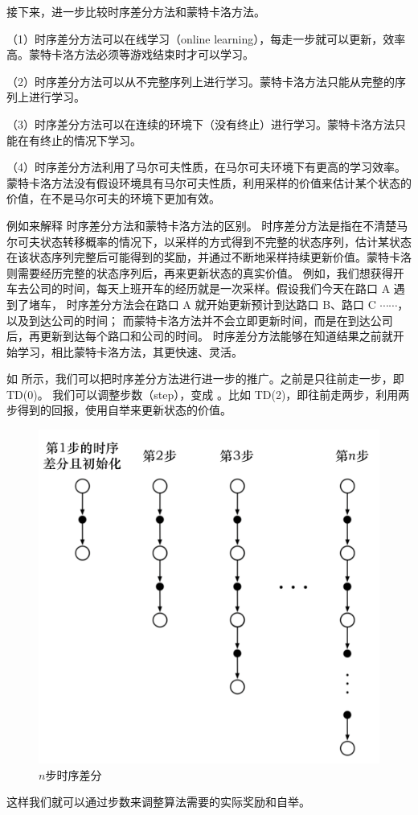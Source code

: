 接下来，进一步比较时序差分方法和蒙特卡洛方法。

（1）时序差分方法可以在线学习（online learning），每走一步就可以更新，效率高。蒙特卡洛方法必须等游戏结束时才可以学习。

（2）时序差分方法可以从不完整序列上进行学习。蒙特卡洛方法只能从完整的序列上进行学习。

（3）时序差分方法可以在连续的环境下（没有终止）进行学习。蒙特卡洛方法只能在有终止的情况下学习。

（4）时序差分方法利用了马尔可夫性质，在马尔可夫环境下有更高的学习效率。蒙特卡洛方法没有假设环境具有马尔可夫性质，利用采样的价值来估计某个状态的价值，在不是马尔可夫的环境下更加有效。

例如来解释 时序差分方法和蒙特卡洛方法的区别。
时序差分方法是指在不清楚马尔可夫状态转移概率的情况下，以采样的方式得到不完整的状态序列，估计某状态在该状态序列完整后可能得到的奖励，并通过不断地采样持续更新价值。蒙特卡洛则需要经历完整的状态序列后，再来更新状态的真实价值。
例如，我们想获得开车去公司的时间，每天上班开车的经历就是一次采样。假设我们今天在路口 A 遇到了堵车，
时序差分方法会在路口 A 就开始更新预计到达路口 B、路口 C $\cdots \cdots$，以及到达公司的时间；
而蒙特卡洛方法并不会立即更新时间，而是在到达公司后，再更新到达每个路口和公司的时间。
时序差分方法能够在知道结果之前就开始学习，相比蒙特卡洛方法，其更快速、灵活。


如 所示，我们可以把时序差分方法进行进一步的推广。之前是只往前走一步，即TD(0)。
我们可以调整步数（step），变成 。比如 TD(2)，即往前走两步，利用两步得到的回报，使用自举来更新状态的价值。
\begin{figure}[htb]
	\centering
	\includegraphics[width=0.4\linewidth]{res/ch3/TD_5}
	\caption{$n$步时序差分}
	\label{fig:figTD_5}
\end{figure}
这样我们就可以通过步数来调整算法需要的实际奖励和自举。

